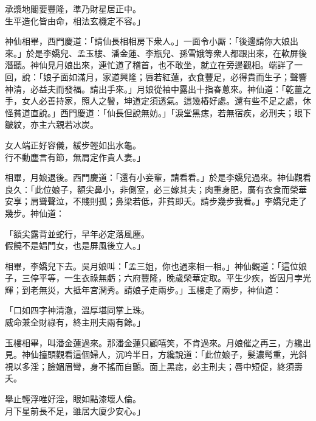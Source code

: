 \begin{myquote}
承漿地閣要豐隆，準乃財星居正中。\\生平造化皆由命，相法玄機定不容。」
\end{myquote}

神仙相畢，西門慶道：「請仙長相相房下衆人。」一面令小厮：「後邊請你大娘出來。」於是李嬌兒、孟玉樓、潘金蓮、李瓶兒、孫雪娥等衆人都跟出來，在軟屏後潛聽。神仙見月娘出來，連忙道了稽首，也不敢坐，就立在旁邊觀相。端詳了一回，說：「娘子面如滿月，家道興隆；唇若紅蓮，衣食豐足，必得貴而生子；聲響神清，必益夫而發福。請出手來。」月娘從袖中露出十指春蔥來。神仙道：「乾薑之手，女人必善持家，照人之鬢，坤道定須透氣。這幾樁好處。還有些不足之處，休怪貧道直說。」西門慶道：「仙長但說無妨。」「淚堂黑痣，若無宿疾，必刑夫；眼下皺紋，亦主六親若冰炭。

\begin{myquote}
女人端正好容儀，緩步輕如出水龜。\\行不動塵言有節，無肩定作貴人妻。」
\end{myquote}

相畢，月娘退後。西門慶道：「還有小妾輩，請看看。」於是李嬌兒過來。神仙觀看良久：「此位娘子，額尖鼻小，非側室，必三嫁其夫；肉重身肥，廣有衣食而榮華安享；肩聳聲泣，不賤則孤；鼻梁若低，非貧即夭。{}請步幾步我看。」李嬌兒走了幾步。神仙道：

\begin{myquote}
「額尖露背並蛇行，早年必定落風塵。\\假饒不是娼門女，也是屏風後立人。」
\end{myquote}

相畢，李嬌兒下去。吳月娘叫：「孟三姐，你也過來相一相。」神仙觀道：「這位娘子，三停平等，一生衣祿無虧；六府豐隆，晚歲榮華定取。平生少疾，皆因月孛光輝；到老無災，大抵年宮潤秀。請娘子走兩步。」玉樓走了兩步，神仙道：

\begin{myquote}
「口如四字神清澈，溫厚堪同掌上珠。\\威命兼全財祿有，終主刑夫兩有餘。」
\end{myquote}

玉樓相畢，叫潘金蓮過來。那潘金蓮只顧嘻笑，不肯過來。{}月娘催之再三，方纔出見。神仙擡頭觀看這個婦人，沉吟半日，方纔說道：「此位娘子，髮濃髩重，{}光斜視以多淫；臉媚眉彎，身不搖而自顫。面上黑痣，必主刑夫；唇中短促，終須壽夭。

\begin{myquote}
舉止輕浮唯好淫，眼如點漆壞人倫。\\月下星前長不足，雖居大廈少安心。」
\end{myquote}

